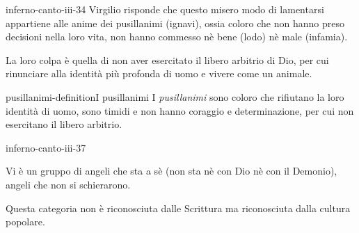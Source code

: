 \documentclass[preview]{standalone}
\begin{document}
\begin{snippet}{inferno-canto-iii-34}
    Virgilio risponde che questo misero modo di lamentarsi appartiene
    alle anime dei pusillanimi (ignavi), ossia coloro che non hanno preso decisioni
    nella loro vita, non hanno commesso nè bene (lodo) nè male (infamia).
    
    La loro colpa è quella di non aver esercitato il libero arbitrio di Dio,
    per cui rinunciare alla identità più profonda di uomo e vivere come un animale.    
\end{snippet}

\begin{snippetdefinition}{pusillanimi-definition}{I pusillanimi}
    I \textit{pusillanimi} sono coloro che rifiutano la loro identità di uomo,
    sono timidi e non hanno coraggio e determinazione, per cui non esercitano il libero arbitrio.
\end{snippetdefinition}

\begin{snippet}{inferno-canto-iii-37}
    
    Vi è un gruppo di angeli che sta a sè (non sta nè con Dio nè con il Demonio), angeli che non si schierarono.

    Questa categoria non è riconosciuta dalle Scrittura ma riconosciuta dalla cultura popolare.
\end{snippet}
\end{document}
